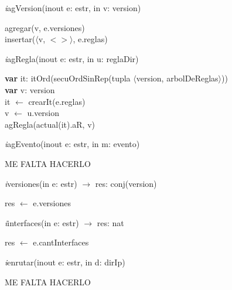 \vspace{11pt}

\textit{i}agVersion(inout e: estr, in v: version)\\
\begin{algorithm}[H]
\BlankLine
agregar(v, e.versiones)\\
insertar($\langle$v, $<>\rangle$, e.reglas)\\
\end{algorithm}

\vspace{11pt}

\textit{i}agRegla(inout e: estr, in u: reglaDir)\\
\begin{algorithm}[H]
\BlankLine
\textbf{var} it: itOrd(secuOrdSinRep(tupla $\langle$version, arbolDeReglas$\rangle$))\\
\textbf{var} v: version\\
\BlankLine
it $\leftarrow$ crearIt(e.reglas) \\
v  $\leftarrow$ u.version\\
\BlankLine
{}
agRegla(actual(it).aR, v)
\end{algorithm}

\vspace{11pt}

\textit{i}agEvento(inout e: estr, in m: evento)\\
\begin{algorithm}[H]
ME FALTA HACERLO
\end{algorithm}

\vspace{11pt}

\textit{i}versiones(in e: estr) $\longrightarrow$ res: conj(version)\\
\begin{algorithm}[H]
\BlankLine
res $\leftarrow$ e.versiones
\end{algorithm}

\vspace{11pt}

\textit{i}interfaces(in e: estr) $\longrightarrow$ res: nat\\
\begin{algorithm}[H]
\BlankLine
res $\leftarrow$ e.cantInterfaces
\end{algorithm}

\vspace{11pt}

\textit{i}enrutar(inout e: estr, in d: dirIp)\\
\begin{algorithm}[H]
\BlankLine
ME FALTA HACERLO
\end{algorithm}

